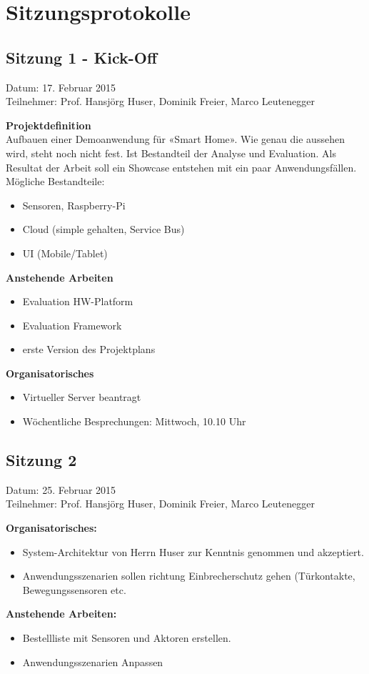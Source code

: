 \chapter{Sitzungsprotokolle}
\label{chap:Sitzungsprotokolle}
\section{Sitzung 1 - Kick-Off}
Datum: 17. Februar 2015 \\
Teilnehmer: Prof. Hansjörg Huser, Dominik Freier, Marco Leutenegger

\textbf{Projektdefinition} \\
Aufbauen einer Demoanwendung für «Smart Home». Wie genau die aussehen wird, steht noch nicht fest. Ist Bestandteil der Analyse und Evaluation. Als Resultat der Arbeit soll ein Showcase entstehen mit ein paar Anwendungsfällen. \\
Mögliche Bestandteile:
\begin{itemize}
	\item Sensoren, Raspberry-Pi
	\item Cloud (simple gehalten, Service Bus)
	\item UI (Mobile/Tablet)
\end{itemize}

\textbf{Anstehende Arbeiten}
\begin{itemize}
	\item Evaluation HW-Platform
	\item Evaluation Framework
	\item erste Version des Projektplans
\end{itemize}

\textbf{Organisatorisches}

\begin{itemize}
	\item Virtueller Server beantragt
	\item Wöchentliche Besprechungen: Mittwoch, 10.10 Uhr
\end{itemize}

\section{Sitzung 2}
Datum: 25. Februar 2015 \\
Teilnehmer: Prof. Hansjörg Huser, Dominik Freier, Marco Leutenegger

\textbf{Organisatorisches:}
\begin{itemize}
	\item System-Architektur von Herrn Huser zur Kenntnis genommen und akzeptiert.
	\item Anwendungsszenarien sollen richtung Einbrecherschutz gehen (Türkontakte, Bewegungssensoren etc.
\end{itemize}


\textbf{Anstehende Arbeiten:}
\begin{itemize}
	\item Bestellliste mit Sensoren und Aktoren erstellen.
	\item Anwendungsszenarien Anpassen
\end{itemize}
